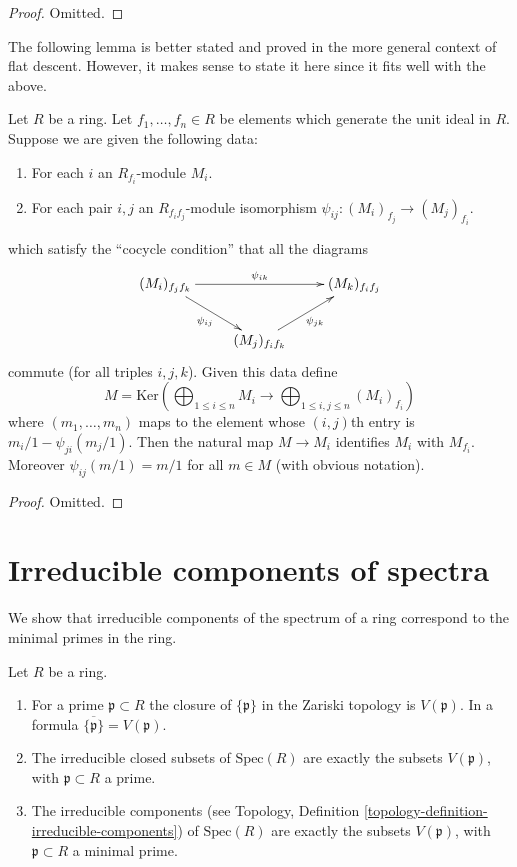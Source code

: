 \begin{proof}
Omitted.
\end{proof}

\noindent
The following lemma is better stated and proved in the more general
context of flat descent. However, it makes sense to state it here
since it fits well with the above.

\begin{lemma}
\label{lemma-glue-modules}
Let $R$ be a ring. Let $f_1, \ldots, f_n \in R$ be elements
which generate the unit ideal in $R$. Suppose we are given
the following data:
\begin{enumerate}
\item For each $i$ an $R_{f_i}$-module $M_i$.
\item For each pair $i, j$ an $R_{f_if_j}$-module isomorphism
$\psi_{ij} : (M_i)_{f_j} \to (M_j)_{f_i}$.
\end{enumerate}
which satisfy the ``cocycle condition'' that all the diagrams
$$
\xymatrix{
(M_i)_{f_jf_k}
\ar[rd]_{\psi_{ij}}
\ar[rr]^{\psi_{ik}}
& &
(M_k)_{f_if_j} \\
&
(M_j)_{f_if_k} \ar[ru]_{\psi_{jk}}
}
$$
commute (for all triples $i, j, k$). Given this data define
$$
M = \text{Ker}\left(
\bigoplus\nolimits_{1 \leq i \leq n} M_i
\longrightarrow
\bigoplus\nolimits_{1 \leq i, j \leq n} (M_i)_{f_i}
\right)
$$
where $(m_1, \ldots, m_n)$ maps to the element whose
$(i,j)$th entry is $m_i/1 - \psi_{ji}(m_j/1)$.
Then the natural map $M \to M_i$ identifies
$M_i$ with $M_{f_i}$. Moreover $\psi_{ij}(m/1) = m/1$
for all $m \in M$ (with obvious notation).
\end{lemma}

\begin{proof}
Omitted.
\end{proof}








\section{Irreducible components of spectra}
\label{section-irreducible}

\noindent
We show that irreducible components of
the spectrum of a ring correspond to the
minimal primes in the ring.

\begin{lemma}
\label{lemma-irreducible}
Let $R$ be a ring.
\begin{enumerate}
\item For a prime $\mathfrak p \subset R$ the closure
of $\{\mathfrak p\}$ in the Zariski topology is $V(\mathfrak p)$.
In a formula $\overline{\{\mathfrak p\}} = V(\mathfrak p)$.
\item The irreducible closed subsets of $\text{Spec}(R)$ are
exactly the subsets $V(\mathfrak p)$, with $\mathfrak p \subset R$
a prime.
\item The irreducible components (see Topology,
Definition \ref{topology-definition-irreducible-components})
of $\text{Spec}(R)$ are  exactly the subsets $V(\mathfrak p)$,
with $\mathfrak p \subset R$ a minimal prime.
\end{enumerate}
\end{lemma}

